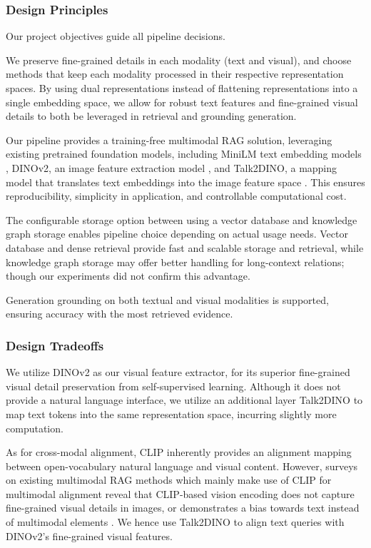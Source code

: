 \subsubsection{Design Principles}
Our project objectives guide all pipeline decisions.

We preserve fine-grained details in each modality (text and visual), and choose methods that keep each modality processed 
in their respective representation spaces.
By using dual representations instead of flattening representations into a single embedding space,
we allow for robust text features and fine-grained visual details to both be leveraged in retrieval and grounding generation.

Our pipeline provides a training-free multimodal RAG solution, leveraging existing pretrained foundation models,
including MiniLM text embedding models \cite{10.5555/3495724.3496209}, DINOv2, an image feature extraction model \cite{oquab2024dinov2learningrobustvisual},
and Talk2DINO, a mapping model that translates text embeddings into the image feature space \cite{Barsellotti_2025_ICCV}.
This ensures reproducibility, simplicity in application, and controllable computational cost.

The configurable storage option between using a vector database and knowledge graph storage enables pipeline choice depending on actual usage needs.
Vector database and dense retrieval provide fast and scalable storage and retrieval,
while knowledge graph storage may offer better handling for long-context relations; though our experiments did not confirm this advantage.

Generation grounding on both textual and visual modalities is supported, ensuring accuracy with the most retrieved evidence.

\subsubsection{Design Tradeoffs}

We utilize DINOv2 \cite{oquab2024dinov2learningrobustvisual} as our visual feature extractor, 
for its superior fine-grained visual detail preservation from self-supervised learning.
Although it does not provide a natural language interface, we utilize an additional layer Talk2DINO \cite{Barsellotti_2025_ICCV}
to map text tokens into the same representation space, incurring slightly more computation.

As for cross-modal alignment, CLIP \cite{radford2021learningtransferablevisualmodels} inherently provides an alignment mapping
between open-vocabulary natural language and visual content.
However, surveys on existing multimodal RAG methods which mainly make use of CLIP for multimodal alignment reveal that
CLIP-based vision encoding does not capture fine-grained visual details in images, or demonstrates a bias towards text 
instead of multimodal elements \cite{abootorabi-etal-2025-ask,lin2025mmembeduniversalmultimodalretrieval}.
We hence use Talk2DINO \cite{Barsellotti_2025_ICCV} to align text queries with DINOv2's fine-grained visual features.

